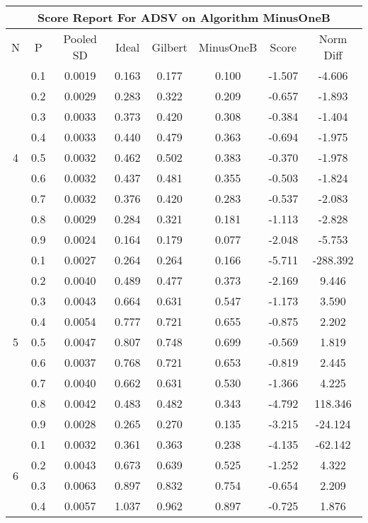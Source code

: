 \documentclass[11pt,a4paper]{report}
\begin{document}
\begin{longtable}{ | c | c || c | c | c | c | c | c | }
\hline
\multicolumn{8}{|c|}{ Score Report For ADSV on Algorithm MinusOneB} \\
\hline
N & P & Pooled SD &  Ideal &  Gilbert & MinusOneB  & Score & Norm Diff \\
 \hline
 \hline
 \endhead
\multirow{9}{*}{4} & 0.1 & 0.0019 & 0.163 & 0.177 & 0.100 & -1.507 & -4.606 \\
 & 0.2 & 0.0029 & 0.283 & 0.322 & 0.209 & -0.657 & -1.893 \\
 & 0.3 & 0.0033 & 0.373 & 0.420 & 0.308 & -0.384 & -1.404 \\
 & 0.4 & 0.0033 & 0.440 & 0.479 & 0.363 & -0.694 & -1.975 \\
 & 0.5 & 0.0032 & 0.462 & 0.502 & 0.383 & -0.370 & -1.978 \\
 & 0.6 & 0.0032 & 0.437 & 0.481 & 0.355 & -0.503 & -1.824 \\
 & 0.7 & 0.0032 & 0.376 & 0.420 & 0.283 & -0.537 & -2.083 \\
 & 0.8 & 0.0029 & 0.284 & 0.321 & 0.181 & -1.113 & -2.828 \\
 & 0.9 & 0.0024 & 0.164 & 0.179 & 0.077 & -2.048 & -5.753 \\
 \hline
\multirow{9}{*}{5} & 0.1 & 0.0027 & 0.264 & 0.264 & 0.166 & -5.711 & -288.392 \\
 & 0.2 & 0.0040 & 0.489 & 0.477 & 0.373 & -2.169 & 9.446 \\
 & 0.3 & 0.0043 & 0.664 & 0.631 & 0.547 & -1.173 & 3.590 \\
 & 0.4 & 0.0054 & 0.777 & 0.721 & 0.655 & -0.875 & 2.202 \\
 & 0.5 & 0.0047 & 0.807 & 0.748 & 0.699 & -0.569 & 1.819 \\
 & 0.6 & 0.0037 & 0.768 & 0.721 & 0.653 & -0.819 & 2.445 \\
 & 0.7 & 0.0040 & 0.662 & 0.631 & 0.530 & -1.366 & 4.225 \\
 & 0.8 & 0.0042 & 0.483 & 0.482 & 0.343 & -4.792 & 118.346 \\
 & 0.9 & 0.0028 & 0.265 & 0.270 & 0.135 & -3.215 & -24.124 \\
 \hline
\multirow{9}{*}{6} & 0.1 & 0.0032 & 0.361 & 0.363 & 0.238 & -4.135 & -62.142 \\
 & 0.2 & 0.0043 & 0.673 & 0.639 & 0.525 & -1.252 & 4.322 \\
 & 0.3 & 0.0063 & 0.897 & 0.832 & 0.754 & -0.654 & 2.209 \\
 & 0.4 & 0.0057 & 1.037 & 0.962 & 0.897 & -0.725 & 1.876 \\

\end{longtable}
\end{document}
